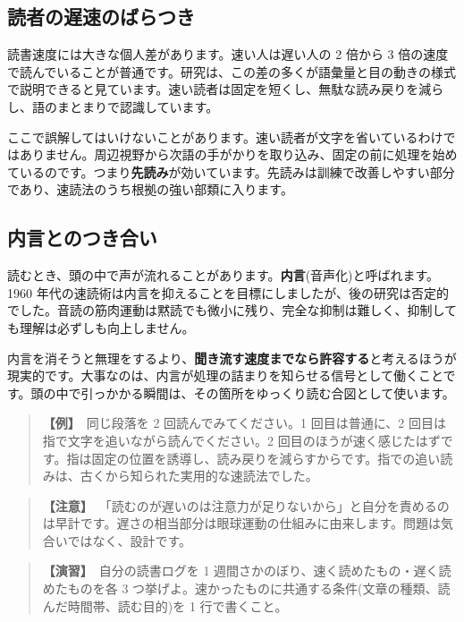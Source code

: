 \documentclass{article}
\begin{document}
\subsection{読者の遅速のばらつき}

読書速度には大きな個人差があります。速い人は遅い人の 2 倍から 3 倍の速度で読んでいることが普通です。研究は、この差の多くが語彙量と目の動きの様式で説明できると見ています。速い読者は固定を短くし、無駄な読み戻りを減らし、語のまとまりで認識しています。

ここで誤解してはいけないことがあります。速い読者が文字を省いているわけではありません。周辺視野から次語の手がかりを取り込み、固定の前に処理を始めているのです。つまり\textbf{先読み}が効いています。先読みは訓練で改善しやすい部分であり、速読法のうち根拠の強い部類に入ります。

\subsection{内言とのつき合い}

読むとき、頭の中で声が流れることがあります。\textbf{内言}(音声化)と呼ばれます。1960 年代の速読術は内言を抑えることを目標にしましたが、後の研究は否定的でした。音読の筋肉運動は黙読でも微小に残り、完全な抑制は難しく、抑制しても理解は必ずしも向上しません。

内言を消そうと無理をするより、\textbf{聞き流す速度までなら許容する}と考えるほうが現実的です。大事なのは、内言が処理の詰まりを知らせる信号として働くことです。頭の中で引っかかる瞬間は、その箇所をゆっくり読む合図として使います。

\begin{quote}
\textbf{【例】}\ 同じ段落を 2 回読んでみてください。1 回目は普通に、2 回目は指で文字を追いながら読んでください。2 回目のほうが速く感じたはずです。指は固定の位置を誘導し、読み戻りを減らすからです。指での追い読みは、古くから知られた実用的な速読法でした。
\end{quote}

\begin{quote}
\textbf{【注意】}\ 「読むのが遅いのは注意力が足りないから」と自分を責めるのは早計です。遅さの相当部分は眼球運動の仕組みに由来します。問題は気合いではなく、設計です。
\end{quote}

\begin{quote}
\textbf{【演習】}\ 自分の読書ログを 1 週間さかのぼり、速く読めたもの・遅く読めたものを各 3 つ挙げよ。速かったものに共通する条件(文章の種類、読んだ時間帯、読む目的)を 1 行で書くこと。
\end{quote}
\end{document}
